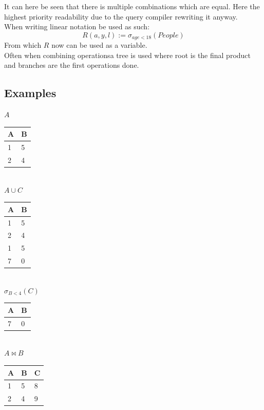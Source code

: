 \documentclass[12pt, a4paper]{article}
\begin{document}
		It can here be seen that there is multiple combinations which are equal. Here the highest priority readability due to the query compiler rewriting it anyway.\\
		When writing linear notation be used as such:
		$$R(a,y,l):=\sigma_{age<18}(People)$$
		From which $R$ now can be used as a variable.\\
		Often when combining operationsa tree is used where root is the final product and branches are the first operations done.
		\subsection{Examples}
			\begin{minipage}[t]{0.32\textwidth}
				\begin{center}
				$A$\\
				\begin{tabular}{|l|l|}
				\hline
				A & B \\ \hline
				1 & 5 \\ \hline
				2 & 4 \\ \hline
				\end{tabular}\\[4mm]
				$A\cup C$\\
				\begin{tabular}{|l|l|}
				\hline
				A & B \\ \hline
				1 & 5 \\ \hline
				2 & 4 \\ \hline
				1 & 5 \\ \hline
				7 & 0 \\ \hline
				\end{tabular}\\[4mm]
				$\sigma_{B<4}(C)$\\
				\begin{tabular}{|l|l|}
				\hline
				A & B \\ \hline
				7 & 0 \\ \hline
				\end{tabular}\\[4mm]
				$A\bowtie B$\\
				\begin{tabular}{|l|l|l|}
				\hline
				 A & B & C \\ \hline
				 1 & 5 & 8 \\ \hline
				 2 & 4 & 9 \\ \hline
				\end{tabular}
				
				\end{center}
			\end{minipage}
\end{document}
